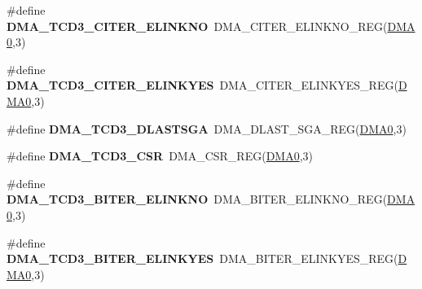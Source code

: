 \begin{DoxyCompactItemize}
\item 
\#define {\bfseries D\+M\+A\+\_\+\+T\+C\+D3\+\_\+\+C\+I\+T\+E\+R\+\_\+\+E\+L\+I\+N\+K\+NO}~D\+M\+A\+\_\+\+C\+I\+T\+E\+R\+\_\+\+E\+L\+I\+N\+K\+N\+O\+\_\+\+R\+EG(\hyperlink{group__DMA__Peripheral__Access__Layer_ga4103044f9ca209772f513dc694513ffb}{D\+M\+A0},3)\hypertarget{group__DMA__Register__Accessor__Macros_gac7f6258ced19b6d5b2589bb46ab8014d}{}\label{group__DMA__Register__Accessor__Macros_gac7f6258ced19b6d5b2589bb46ab8014d}

\item 
\#define {\bfseries D\+M\+A\+\_\+\+T\+C\+D3\+\_\+\+C\+I\+T\+E\+R\+\_\+\+E\+L\+I\+N\+K\+Y\+ES}~D\+M\+A\+\_\+\+C\+I\+T\+E\+R\+\_\+\+E\+L\+I\+N\+K\+Y\+E\+S\+\_\+\+R\+EG(\hyperlink{group__DMA__Peripheral__Access__Layer_ga4103044f9ca209772f513dc694513ffb}{D\+M\+A0},3)\hypertarget{group__DMA__Register__Accessor__Macros_ga4a8907e1cd9237bc52b3f58c16389781}{}\label{group__DMA__Register__Accessor__Macros_ga4a8907e1cd9237bc52b3f58c16389781}

\item 
\#define {\bfseries D\+M\+A\+\_\+\+T\+C\+D3\+\_\+\+D\+L\+A\+S\+T\+S\+GA}~D\+M\+A\+\_\+\+D\+L\+A\+S\+T\+\_\+\+S\+G\+A\+\_\+\+R\+EG(\hyperlink{group__DMA__Peripheral__Access__Layer_ga4103044f9ca209772f513dc694513ffb}{D\+M\+A0},3)\hypertarget{group__DMA__Register__Accessor__Macros_ga5a4b16e69f639dffe7081c7e8b083cbe}{}\label{group__DMA__Register__Accessor__Macros_ga5a4b16e69f639dffe7081c7e8b083cbe}

\item 
\#define {\bfseries D\+M\+A\+\_\+\+T\+C\+D3\+\_\+\+C\+SR}~D\+M\+A\+\_\+\+C\+S\+R\+\_\+\+R\+EG(\hyperlink{group__DMA__Peripheral__Access__Layer_ga4103044f9ca209772f513dc694513ffb}{D\+M\+A0},3)\hypertarget{group__DMA__Register__Accessor__Macros_ga4cd4b37d23c6c4cd59c8e75abc49a620}{}\label{group__DMA__Register__Accessor__Macros_ga4cd4b37d23c6c4cd59c8e75abc49a620}

\item 
\#define {\bfseries D\+M\+A\+\_\+\+T\+C\+D3\+\_\+\+B\+I\+T\+E\+R\+\_\+\+E\+L\+I\+N\+K\+NO}~D\+M\+A\+\_\+\+B\+I\+T\+E\+R\+\_\+\+E\+L\+I\+N\+K\+N\+O\+\_\+\+R\+EG(\hyperlink{group__DMA__Peripheral__Access__Layer_ga4103044f9ca209772f513dc694513ffb}{D\+M\+A0},3)\hypertarget{group__DMA__Register__Accessor__Macros_ga3b8e5cd5463badcff9d9de63e01ba131}{}\label{group__DMA__Register__Accessor__Macros_ga3b8e5cd5463badcff9d9de63e01ba131}

\item 
\#define {\bfseries D\+M\+A\+\_\+\+T\+C\+D3\+\_\+\+B\+I\+T\+E\+R\+\_\+\+E\+L\+I\+N\+K\+Y\+ES}~D\+M\+A\+\_\+\+B\+I\+T\+E\+R\+\_\+\+E\+L\+I\+N\+K\+Y\+E\+S\+\_\+\+R\+EG(\hyperlink{group__DMA__Peripheral__Access__Layer_ga4103044f9ca209772f513dc694513ffb}{D\+M\+A0},3)\hypertarget{group__DMA__Register__Accessor__Macros_ga78fb2452c2df35600818d0dc072bb308}{}\label{group__DMA__Register__Accessor__Macros_ga78fb2452c2df35600818d0dc072bb308}


\end{DoxyCompactItemize}
